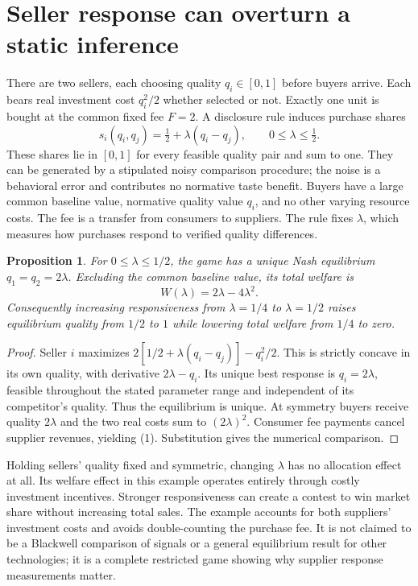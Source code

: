 \documentclass[11pt,a4paper]{article}
\newtheorem{proposition}[theorem]{Proposition}
\begin{document}
\section{Seller response can overturn a static inference}
There are two sellers, each choosing quality $q_i\in[0,1]$ before buyers arrive. Each bears real investment cost $q_i^2/2$ whether selected or not. Exactly one unit is bought at the common fixed fee $F=2$. A disclosure rule induces purchase shares
\[
 s_i(q_i,q_j)=\tfrac12+\lambda(q_i-q_j),\qquad
 0\le\lambda\le\tfrac12.
\]
These shares lie in $[0,1]$ for every feasible quality pair and sum to one. They can be generated by a stipulated noisy comparison procedure; the noise is a behavioral error and contributes no normative taste benefit. Buyers have a large common baseline value, normative quality value $q_i$, and no other varying resource costs. The fee is a transfer from consumers to suppliers. The rule fixes $\lambda$, which measures how purchases respond to verified quality differences.
\begin{proposition}
For $0\le\lambda\le1/2$, the game has a unique Nash equilibrium $q_1=q_2=2\lambda$. Excluding the common baseline value, its total welfare is
\[
 W(\lambda)=2\lambda-4\lambda^2.
\tag{1}
\]
Consequently increasing responsiveness from $\lambda=1/4$ to $\lambda=1/2$ raises equilibrium quality from $1/2$ to $1$ while lowering total welfare from $1/4$ to zero.
\end{proposition}
\begin{proof}
Seller $i$ maximizes $2[1/2+\lambda(q_i-q_j)]-q_i^2/2$. This is strictly concave in its own quality, with derivative $2\lambda-q_i$. Its unique best response is $q_i=2\lambda$, feasible throughout the stated parameter range and independent of its competitor's quality. Thus the equilibrium is unique. At symmetry buyers receive quality $2\lambda$ and the two real costs sum to $(2\lambda)^2$. Consumer fee payments cancel supplier revenues, yielding (1). Substitution gives the numerical comparison.
\end{proof}
Holding sellers' quality fixed and symmetric, changing $\lambda$ has no allocation effect at all. Its welfare effect in this example operates entirely through costly investment incentives. Stronger responsiveness can create a contest to win market share without increasing total sales. The example accounts for both suppliers' investment costs and avoids double-counting the purchase fee. It is not claimed to be a Blackwell comparison of signals or a general equilibrium result for other technologies; it is a complete restricted game showing why supplier response measurements matter.
\end{document}
